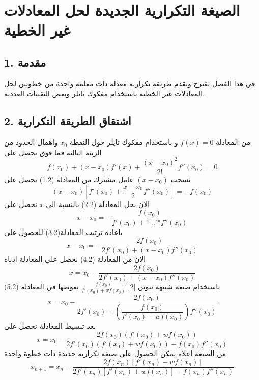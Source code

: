 \chapter{الصيغة التكرارية الجديدة لحل المعادلات غير الخطية}

\section*{1. مقدمة}
في هذا الفصل نقترح ونقدم طريقة تكرارية معدلة ذات معلمة واحدة من خطوتين لحل المعادلات غير الخطية باستخدام مفكوك تايلر وبعض التقنيات العددية.

\section*{2. اشتقاق الطريقة التكرارية}
من المعادلة $f(x)=0$ و باستخدام مفكوك تايلر حول النقطة $x_0$ واهمال الحدود من الرتبة الثالثة فما فوق نحصل على
\begin{equation}
f(x_0) + (x-x_0)f'(x) + \frac{(x-x_0)^2}{2!} f''(x_0) = 0 
\end{equation}
نسحب $(x-x_0)$ عامل مشترك من المعادلة (1.2) نحصل على
\begin{equation}
(x-x_0)\left[f'(x_0) + \frac{x-x_0}{2} f''(x_0)\right] = -f(x_0) 
\end{equation}
الان بحل المعادلة (2.2) بالنسبة الى $x$ نحصل على 
\begin{equation}
x-x_0 = - \frac{f(x_0)}{f'(x_0)+\frac{x-x_0}{2}f''(x_0)}
\end{equation}
باعادة ترتيب المعادلة(3.2) للحصول على
\begin{equation}
x-x_0 = - \frac{2f(x_0)}{2f'(x_0) + (x-x_0)f''(x_0)}
\end{equation}
الان من المعادلة (4.2) نحصل على المعادلة ادناه
\begin{equation}
x =x_0 - \frac{2f(x_0)}{2f'(x_0) + (x-x_0)f''(x_0)}
\end{equation}
باستخدام صيغة شبيهة نيوتن [2]
$\frac{f(x_0)}{f'(x_0)+wf(x_0)}$
نعوضها في المعادلة (5.2)
	\[
x =x_0 - \frac{2f(x_0)}{2f'(x_0) + \left(\dfrac{f(x_0)}{f'(x_0)+wf(x_0)}\right)f''(x_0)} 
\]
بعد تبسيط المعادلة نحصل على
\begin{equation}
x = x_0 - \frac{2f(x_0)(f'(x_0)+wf(x_0))}{2f'(x_0)(f'(x_0)+wf(x_0)) - f(x_0)f''(x_0)} 
\end{equation}
من الصيغة اعلاه يمكن الحصول على صيغة تكرارية جديدة ذات خطوة واحدة
\begin{equation}
x_{n+1} = x_n - \frac{2f(x_n)[f'(x_n)+wf(x_n)]}{2f'(x_n)[f'(x_n)+wf(x_n)] - f(x_n)f''(x_n)} 
\end{equation}
